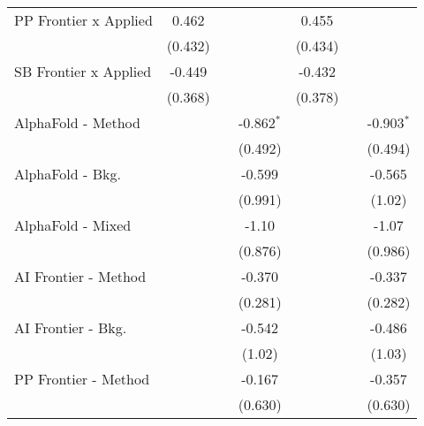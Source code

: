 \begin{tabular}{lcccccc}
   PP Frontier x Applied        & 0.462         &              &              & 0.455         &              &   \\   
                                & (0.432)       &              &              & (0.434)       &              &   \\   
   SB Frontier x Applied        & -0.449        &              &              & -0.432        &              &   \\   
                                & (0.368)       &              &              & (0.378)       &              &   \\   
   AlphaFold - Method           &               &              & -0.862$^{*}$ &               &              & -0.903$^{*}$\\   
                                &               &              & (0.492)      &               &              & (0.494)\\   
   AlphaFold - Bkg.             &               &              & -0.599       &               &              & -0.565\\   
                                &               &              & (0.991)      &               &              & (1.02)\\   
   AlphaFold - Mixed            &               &              & -1.10        &               &              & -1.07\\   
                                &               &              & (0.876)      &               &              & (0.986)\\   
   AI Frontier - Method         &               &              & -0.370       &               &              & -0.337\\   
                                &               &              & (0.281)      &               &              & (0.282)\\   
   AI Frontier - Bkg.           &               &              & -0.542       &               &              & -0.486\\   
                                &               &              & (1.02)       &               &              & (1.03)\\   
   PP Frontier - Method         &               &              & -0.167       &               &              & -0.357\\   
                                &               &              & (0.630)      &               &              & (0.630)\\   

\end{tabular}
